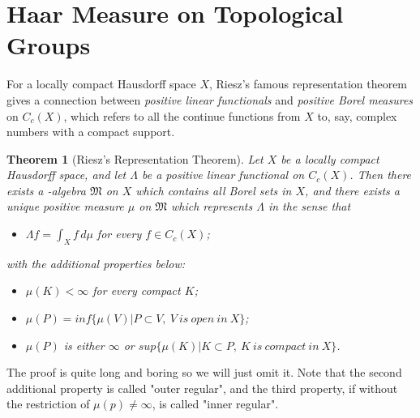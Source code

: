 \documentclass[12pt,a4paper]{article}
\newtheorem{thm}{Theorem}
\begin{document}
\section{Haar Measure on Topological Groups}
For a locally compact Hausdorff space $X$, Riesz's famous representation theorem gives a connection between \emph{positive linear functionals} and \emph{positive Borel measures} on $C_c(X)$, which refers to all the continue functions from $X$ to, say, complex numbers with a compact support.
\begin{thm}[Riesz's Representation Theorem]
    Let $X$ be a locally compact Hausdorff space, and let $\Lambda$ be a positive linear functional on $C_c(X)$. Then there exists a \sigma-algebra $\mathfrak{M}$ on $X$ which contains all Borel sets in $X$, and there exists a unique positive measure $\mu$ on $\mathfrak{M}$ which represents $\Lambda$ in the sense that 
    \begin{itemize}
        \item $\Lambda f=\int_X f\,d\mu$ for every $f\in C_c(X)$;
    \end{itemize}
with the additional properties below:
    \begin{itemize}
        \item $\mu(K)<\infty$ for every compact $K$;
        \item $\mu(P)=inf\{\mu(V)|P\subset V,\ V\ is\ open\ in\ X\}$;
        \item $\mu(P)$ is either $\infty$ or $sup\{\mu(K)|K\subset P,\ K\ is\ compact\ in\ X\}$.
    \end{itemize}
\end{thm}
The proof is quite long and boring so we will just omit it. Note that the second additional property is called "outer regular", and the third property, if without the restriction of $\mu(p)\not=\infty$, is called "inner regular".
\end{document}
